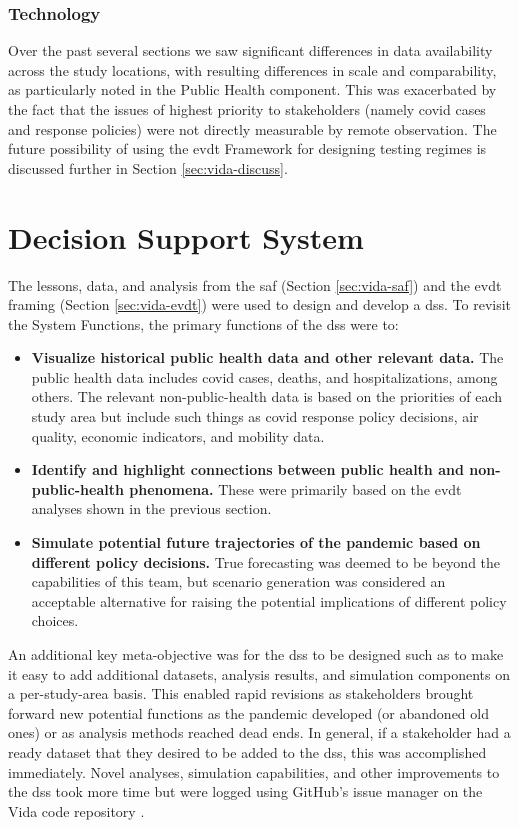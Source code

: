 \subsubsection{Technology}

Over the past several sections we saw significant differences in data availability across the study locations, with resulting differences in scale and comparability, as particularly noted in the Public Health component. This was exacerbated by the fact that the issues of highest priority to stakeholders (namely \ac{covid} cases and response policies) were not directly measurable by remote observation. The future possibility of using the \ac{evdt} Framework for designing testing regimes is discussed further in Section \ref{sec:vida-discuss}.


\section{Decision Support System} \label{sec:vida-dss}

The lessons, data, and analysis from the \ac{saf} (Section \ref{sec:vida-saf}) and the \ac{evdt} framing (Section \ref{sec:vida-evdt}) were used to design and develop a \acf{dss}. To revisit the System Functions, the primary functions of the \ac{dss} were to:

\begin{itemize}[itemsep=0pt,parsep=0pt]
	\item{\textbf{Visualize historical public health data and other relevant data.} The public health data includes \ac{covid} cases, deaths, and hospitalizations, among others. The relevant non-public-health data is based on the priorities of each study area but include such things as \ac{covid} response policy decisions, air quality, economic indicators, and mobility data.}
	\item{\textbf{Identify and highlight connections between public health and non-public-health phenomena.} These were primarily based on the \ac{evdt} analyses shown in the previous section.}
	\item{\textbf{Simulate potential future trajectories of the pandemic based on different policy decisions.} True forecasting was deemed to be beyond the capabilities of this team, but scenario generation was considered an acceptable alternative for raising the potential implications of different policy choices.} 
\end{itemize}

An additional key meta-objective was for the \ac{dss} to be designed such as to make it easy to add additional datasets, analysis results, and simulation components on a per-study-area basis. This enabled rapid revisions as stakeholders brought forward new potential functions as the pandemic developed (or abandoned old ones) or as analysis methods reached dead ends. In general, if a stakeholder had a ready dataset that they desired to be added to the \ac{dss}, this was accomplished immediately. Novel analyses, simulation capabilities, and other improvements to the \ac{dss} took more time but were logged using GitHub's issue manager on the Vida code repository \cite{reidMITVidaRepository2021}.

